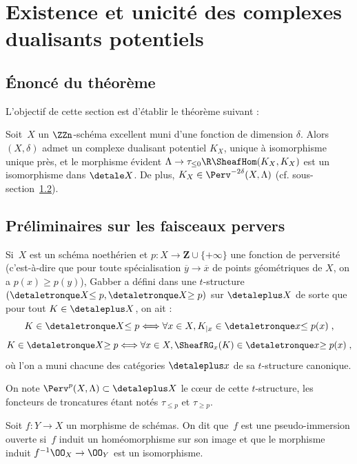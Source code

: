 \documentclass[10pt]{../fichiers-configuration-latex/smfart}
\begin{document}
\section{Existence et unicité des complexes dualisants potentiels}%
\label{17-section-existence-unicite-cdp}
\subsection{Énoncé du théorème}%

L'objectif de cette section est d'établir le théorème suivant :

\begin{theoreme2}\label{17-theoreme-existence-unicite-cdp}
Soit $X$ un $\ZZn$-schéma excellent muni d'une fonction de dimension
$\delta$. Alors $(X,\delta)$ admet un complexe dualisant potentiel $K_X$,
unique à isomorphisme unique près, et le morphisme évident $
\Lambda\to \tau_{\leq 0}\R\SheafHom(K_X,K_X)$
est un isomorphisme dans $\detale X$. De plus,
$K_X\in\Perv^{-2\delta}(X,\Lambda)$ (cf.
sous-section~\ref{17-subsection-faisceaux-pervers}).
\end{theoreme2}

\subsection{Préliminaires sur les faisceaux pervers}%
\label{17-subsection-faisceaux-pervers}

Si $X$ est un schéma noethérien et $p\colon
X\to\mathbf{Z}\cup \{+\infty\}$ une fonction de perversité
(c'est-à-dire que pour toute spécialisation $\overline y\to \overline x$ de
points géométriques de $X$, on a $p(x)\geq p(y)$),
Gabber a défini dans \cite{T@Gabber} une $t$-structure
$(\detaletronque X {\leq p},\detaletronque X {\geq p})$ sur $\detaleplus X$ de sorte que
pour tout $K\in\detaleplus X$, on ait :
\[K\in\detaletronque X {\leq p}\Longleftrightarrow \forall x\in X, K_{|x}\in
\detaletronque x {\leq p(x)}\;\text{,}\]
\[K\in\detaletronque X {\geq p}\Longleftrightarrow \forall x\in X,
\SheafRG_x(K)\in
\detaletronque x {\geq p(x)}\;\text{,}\]
où l'on a muni chacune des catégories $\detaleplus x$ de sa $t$-structure
canonique.

On note $\Perv^p(X,\Lambda)\subset \detaleplus X$ le cœur de cette
$t$-structure, les foncteurs de troncatures étant notés $\tau_{\leq p}$ et
$\tau_{\geq p}$.

\begin{definition2}
Soit $f\colon Y\to X$ un morphisme de schémas. On dit que $f$ est une
pseudo-immersion ouverte si $f$ induit un homéomorphisme sur son image et
que le morphisme induit $f^{-1}\OO_X\to \OO_Y$ est un isomorphisme.
\end{definition2}
\end{document}
